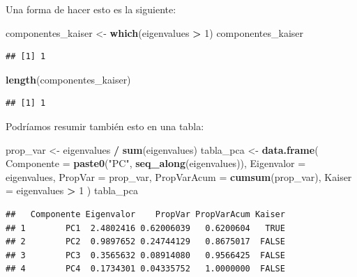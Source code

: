 \documentclass[
]{book}
\newenvironment{Shaded}{\begin{snugshade}}{\end{snugshade}}
\newcommand{\AttributeTok}[1]{\textcolor[rgb]{0.13,0.29,0.53}{#1}}
\newcommand{\DecValTok}[1]{\textcolor[rgb]{0.00,0.00,0.81}{#1}}
\newcommand{\FunctionTok}[1]{\textcolor[rgb]{0.13,0.29,0.53}{\textbf{#1}}}
\newcommand{\NormalTok}[1]{#1}
\newcommand{\OtherTok}[1]{\textcolor[rgb]{0.56,0.35,0.01}{#1}}
\newcommand{\SpecialCharTok}[1]{\textcolor[rgb]{0.81,0.36,0.00}{\textbf{#1}}}
\newcommand{\StringTok}[1]{\textcolor[rgb]{0.31,0.60,0.02}{#1}}
\begin{document}
Una forma de hacer esto es la siguiente:

\begin{Shaded}
\begin{Highlighting}[]
\NormalTok{componentes\_kaiser }\OtherTok{\textless{}{-}} \FunctionTok{which}\NormalTok{(eigenvalues }\SpecialCharTok{\textgreater{}} \DecValTok{1}\NormalTok{)}
\NormalTok{componentes\_kaiser}
\end{Highlighting}
\end{Shaded}

\begin{verbatim}
## [1] 1
\end{verbatim}

\begin{Shaded}
\begin{Highlighting}[]
\FunctionTok{length}\NormalTok{(componentes\_kaiser) }
\end{Highlighting}
\end{Shaded}

\begin{verbatim}
## [1] 1
\end{verbatim}

Podríamos resumir también esto en una tabla:

\begin{Shaded}
\begin{Highlighting}[]
\NormalTok{prop\_var }\OtherTok{\textless{}{-}}\NormalTok{ eigenvalues }\SpecialCharTok{/} \FunctionTok{sum}\NormalTok{(eigenvalues)}
\NormalTok{tabla\_pca }\OtherTok{\textless{}{-}} \FunctionTok{data.frame}\NormalTok{(}
\AttributeTok{Componente =} \FunctionTok{paste0}\NormalTok{(}\StringTok{"PC"}\NormalTok{, }\FunctionTok{seq\_along}\NormalTok{(eigenvalues)),}
\AttributeTok{Eigenvalor =}\NormalTok{ eigenvalues,}
\AttributeTok{PropVar    =}\NormalTok{ prop\_var,}
\AttributeTok{PropVarAcum =} \FunctionTok{cumsum}\NormalTok{(prop\_var),}
\AttributeTok{Kaiser     =}\NormalTok{ eigenvalues }\SpecialCharTok{\textgreater{}} \DecValTok{1}
\NormalTok{)}
\NormalTok{tabla\_pca}
\end{Highlighting}
\end{Shaded}

\begin{verbatim}
##   Componente Eigenvalor    PropVar PropVarAcum Kaiser
## 1        PC1  2.4802416 0.62006039   0.6200604   TRUE
## 2        PC2  0.9897652 0.24744129   0.8675017  FALSE
## 3        PC3  0.3565632 0.08914080   0.9566425  FALSE
## 4        PC4  0.1734301 0.04335752   1.0000000  FALSE
\end{verbatim}
\end{document}
